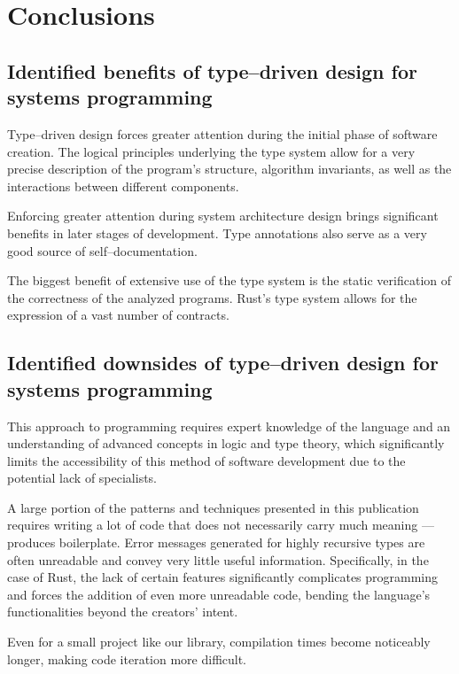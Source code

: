 \chapter{Conclusions}

\section{Identified benefits of type--driven design for systems programming}

Type--driven design forces greater attention during the initial phase of software creation. The logical principles underlying the type system allow for a very precise description of the program's structure, algorithm invariants, as well as the interactions between different components.

Enforcing greater attention during system architecture design brings significant benefits in later stages of development. Type annotations also serve as a very good source of self--documentation.

The biggest benefit of extensive use of the type system is the static verification of the correctness of the analyzed programs. Rust's type system allows for the expression of a vast number of contracts.

\section{Identified downsides of type--driven design for systems programming}

This approach to programming requires expert knowledge of the language and an understanding of advanced concepts in logic and type theory, which significantly limits the accessibility of this method of software development due to the potential lack of specialists.

A large portion of the patterns and techniques presented in this publication requires writing a lot of code that does not necessarily carry much meaning --- produces boilerplate. Error messages generated for highly recursive types are often unreadable and convey very little useful information.
Specifically, in the case of Rust, the lack of certain features significantly complicates programming and forces the addition of even more unreadable code, bending the language's functionalities beyond the creators' intent.

Even for a small project like our library, compilation times become noticeably longer, making code iteration more difficult.

